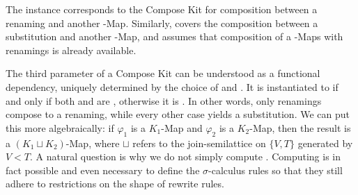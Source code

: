 \documentclass[screen,nonacm]{acmart}
\begin{document}
\noindent\begin{minipage}{0.43\linewidth}
      \raggedright{}
      \AInstanceCRen{}
\end{minipage}
\begin{minipage}{0.53\linewidth}
      \raggedright{}
      \AInstanceCSub{}
\end{minipage}

\noindent The  instance corresponds to the Compose Kit for composition
between a renaming and another -Map. Similarly,  covers the
composition between a substitution and another -Map, and assumes that
composition of a -Maps with renamings is already available.

The third parameter  of a Compose Kit can be understood as a
functional dependency, uniquely determined by the choice of  and
. It is instantiated to  if and only if both
 and  are , otherwise it is
. In other words, only renamings compose to a renaming, while
every other case yields a substitution. We can put this more algebraically: if
$\varphi_1$ is a $K_1$-Map and $\varphi_2$ is a $K_2$-Map, then the result is a
$(K_1 \sqcup K_2)$-Map, where $\sqcup$ refers to the join-semilattice on $\{V,
      T\}$ generated by $V < T$. A natural question is why we do not simply compute
. Computing  is in fact possible and even
necessary to define the $σ$-calculus rules so that they still adhere to
restrictions on the shape of rewrite rules.
\end{document}
